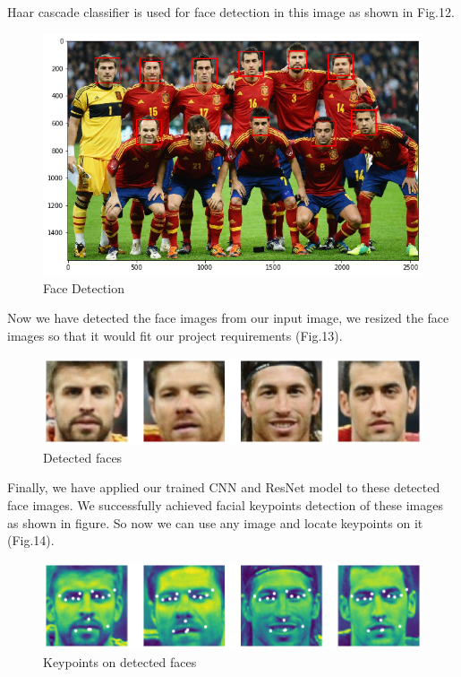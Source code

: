 \documentclass[conference]{IEEEtran}
\begin{document}
Haar cascade classifier is used for face detection in this image as shown in Fig.12. 

\begin{figure}[h!]
    \centering
    \includegraphics[scale=0.35]{original+faceboxes.png}
    \caption{Face Detection}
    \label{fig:my_label}
\end{figure}

Now we have detected the face images from our input image, we resized the face images so that it would fit our project requirements (Fig.13). 

\begin{figure}[h!]
    \centering
    \includegraphics[scale=0.25]{new.png}
    \caption{Detected faces}
    \label{fig:my_label}
\end{figure}

Finally, we have applied our trained CNN and ResNet model to these detected face images. We successfully achieved facial keypoints detection of these images as shown in figure. So now we can use any image and locate keypoints on it (Fig.14).

\begin{figure}[h!]
    \centering
    \includegraphics[scale=0.25]{newdots.png}
    \caption{Keypoints on detected faces}
    \label{fig:my_label}
\end{figure}
\end{document}
